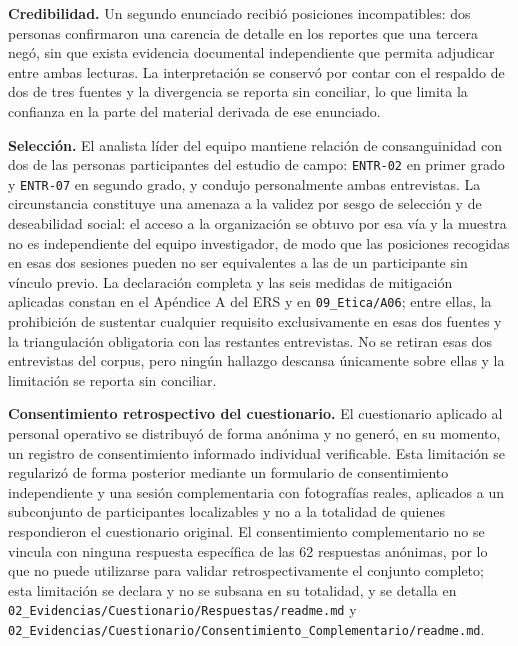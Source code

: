 \documentclass[runningheads]{llncs}
\begin{document}
\textbf{Credibilidad.} Un segundo enunciado recibi\'o posiciones incompatibles: dos
personas confirmaron una carencia de detalle en los reportes que una tercera neg\'o,
sin que exista evidencia documental independiente que permita adjudicar entre ambas
lecturas. La interpretaci\'on se conserv\'o por contar con el respaldo de dos de tres
fuentes y la divergencia se reporta sin conciliar, lo que limita la confianza en la
parte del material derivada de ese enunciado.

\textbf{Selecci\'on.} El analista l\'ider del equipo mantiene relaci\'on de
consanguinidad con dos de las personas participantes del estudio de campo:
\texttt{ENTR-02} en primer grado y \texttt{ENTR-07} en segundo grado, y condujo
personalmente ambas entrevistas. La circunstancia constituye una amenaza a la
validez por sesgo de selecci\'on y de deseabilidad social: el acceso a la
organizaci\'on se obtuvo por esa v\'ia y la muestra no es independiente del
equipo investigador, de modo que las posiciones recogidas en esas dos sesiones
pueden no ser equivalentes a las de un participante sin v\'inculo previo. La
declaraci\'on completa y las seis medidas de mitigaci\'on aplicadas constan en el
Ap\'endice A del ERS y en \texttt{09\_Etica/A06}; entre ellas, la prohibici\'on de
sustentar cualquier requisito exclusivamente en esas dos fuentes y la
triangulaci\'on obligatoria con las restantes entrevistas. No se retiran esas
dos entrevistas del corpus, pero ning\'un hallazgo descansa \'unicamente sobre
ellas y la limitaci\'on se reporta sin conciliar.

\textbf{Consentimiento retrospectivo del cuestionario.} El cuestionario aplicado
al personal operativo se distribuy\'o de forma an\'onima y no gener\'o, en su
momento, un registro de consentimiento informado individual verificable. Esta
limitaci\'on se regulariz\'o de forma posterior mediante un formulario de
consentimiento independiente y una sesi\'on complementaria con fotograf\'ias
reales, aplicados a un subconjunto de participantes localizables y no a la
totalidad de quienes respondieron el cuestionario original. El consentimiento
complementario no se vincula con ninguna respuesta espec\'ifica de las 62
respuestas an\'onimas, por lo que no puede utilizarse para validar
retrospectivamente el conjunto completo; esta limitaci\'on se declara y no se
subsana en su totalidad, y se detalla en
\texttt{02\_Evidencias/Cuestionario/Respuestas/readme.md} y
\texttt{02\_Evidencias/Cuestionario/Consentimiento\_Complementario/readme.md}.
\end{document}
